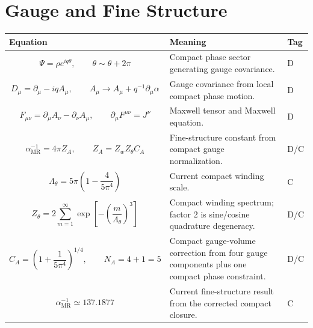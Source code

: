 \documentclass[11pt]{article}
\newcommand{\MR}{\mathrm{MR}}
\begin{document}
\section{Gauge and Fine Structure}
\begin{longtable}{>{\raggedright\arraybackslash}p{} >{\raggedright\arraybackslash}p{} >{\centering\arraybackslash}p{}}
\toprule
\textbf{Equation} & \textbf{Meaning} & \textbf{Tag} \\
\midrule
\endhead

\begin{equation}
\Psi=\rho e^{iq\theta},\qquad \theta\sim\theta+2\pi
\end{equation}
& Compact phase sector generating gauge covariance. & D \\

\begin{equation}
D_\mu=\partial_\mu-iqA_\mu,
\qquad A_\mu\rightarrow A_\mu+q^{-1}\partial_\mu\alpha
\end{equation}
& Gauge covariance from local compact phase motion. & D \\

\begin{equation}
F_{\mu\nu}=\partial_\mu A_\nu-\partial_\nu A_\mu,
\qquad \partial_\mu F^{\mu\nu}=J^\nu
\end{equation}
& Maxwell tensor and Maxwell equation. & D \\

\begin{equation}
\alpha^{-1}_{\MR}=4\pi Z_A,
\qquad Z_A=Z_wZ_\theta C_A
\end{equation}
& Fine-structure constant from compact gauge normalization. & D/C \\

\begin{equation}
\Lambda_\theta=5\pi\left(1-\frac{4}{5\pi^4}\right)
\end{equation}
& Current compact winding scale. & C \\

\begin{equation}
Z_\theta=2\sum_{m=1}^{\infty}\exp\left[-\left(\frac{m}{\Lambda_\theta}\right)^3\right]
\end{equation}
& Compact winding spectrum; factor 2 is sine/cosine quadrature degeneracy. & D/C \\

\begin{equation}
C_A=\left(1+\frac{1}{5\pi^4}\right)^{1/4},
\qquad N_A=4+1=5
\end{equation}
& Compact gauge-volume correction from four gauge components plus one compact phase constraint. & D/C \\

\begin{equation}
\alpha^{-1}_{\MR}\simeq137.1877
\end{equation}
& Current fine-structure result from the corrected compact closure. & C \\

\bottomrule
\end{longtable}
\end{document}
